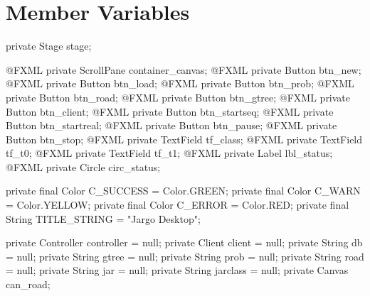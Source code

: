 \section{Member Variables}
\nwenddocs{}\endmoddef{}
private Stage stage;
\nwendcode{}\nwdocspar

\nwenddocs{}\plusendmoddef
@FXML private ScrollPane container_canvas;
@FXML private Button btn_new;
@FXML private Button btn_load;
@FXML private Button btn_prob;
@FXML private Button btn_road;
@FXML private Button btn_gtree;
@FXML private Button btn_client;
@FXML private Button btn_startseq;
@FXML private Button btn_startreal;
@FXML private Button btn_pause;
@FXML private Button btn_stop;
@FXML private TextField tf_class;
@FXML private TextField tf_t0;
@FXML private TextField tf_t1;
@FXML private Label lbl_status;
@FXML private Circle circ_status;
\nwendcode{}\nwdocspar

\nwenddocs{}\plusendmoddef
private final Color C_SUCCESS = Color.GREEN;
private final Color C_WARN = Color.YELLOW;
private final Color C_ERROR = Color.RED;
private final String TITLE_STRING = "Jargo Desktop";
\nwendcode{}\nwdocspar

\nwenddocs{}\plusendmoddef
private Controller controller = null;
private Client client = null;
private String db = null;
private String gtree = null;
private String prob = null;
private String road = null;
private String jar = null;
private String jarclass = null;
private Canvas can_road;
\nwendcode{}\nwdocspar

